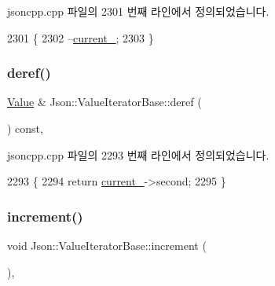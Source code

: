 jsoncpp.\+cpp 파일의 2301 번째 라인에서 정의되었습니다.


\begin{DoxyCode}
2301                                   \{
2302   --\hyperlink{class_json_1_1_value_iterator_base_ab3138ce8af8301cca3b041ea55cb922a}{current\_};
2303 \}
\end{DoxyCode}
\mbox{\label{class_json_1_1_value_iterator_base_aa5b75c9514a30ba2ea3c9a35c165c18e}} 
\subsubsection{\texorpdfstring{deref()}{deref()}}
{\footnotesize\ttfamily \hyperlink{class_json_1_1_value}{Value} \& Json\+::\+Value\+Iterator\+Base\+::deref (\begin{DoxyParamCaption}{ }\end{DoxyParamCaption}) const\hspace{0.3cm}{\ttfamily [protected]}, {\ttfamily [inherited]}}



jsoncpp.\+cpp 파일의 2293 번째 라인에서 정의되었습니다.


\begin{DoxyCode}
2293                                       \{
2294   \textcolor{keywordflow}{return} \hyperlink{class_json_1_1_value_iterator_base_ab3138ce8af8301cca3b041ea55cb922a}{current\_}->second;
2295 \}
\end{DoxyCode}
\mbox{\label{class_json_1_1_value_iterator_base_afe58f9534e1fd2033419fd9fe244551e}} 
\subsubsection{\texorpdfstring{increment()}{increment()}}
{\footnotesize\ttfamily void Json\+::\+Value\+Iterator\+Base\+::increment (\begin{DoxyParamCaption}{ }\end{DoxyParamCaption})\hspace{0.3cm}{\ttfamily [protected]}, {\ttfamily [inherited]}}



